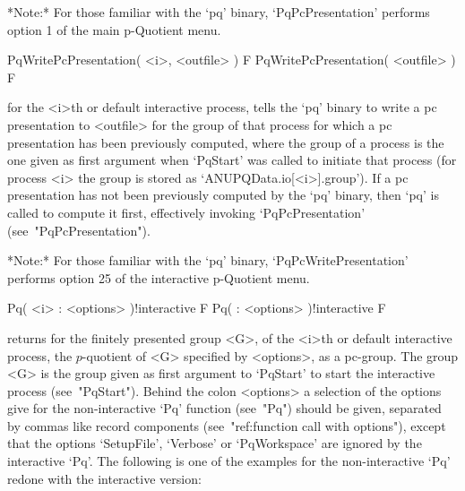 *Note:* For those  familiar  with  the  `pq'  binary,  `PqPcPresentation'
performs option 1 of the main p-Quotient menu.

\>PqWritePcPresentation( <i>, <outfile> ) F
\>PqWritePcPresentation( <outfile> ) F

for the <i>th or default interactive {\ANUPQ}  process,  tells  the  `pq'
binary to write a pc presentation to <outfile>  for  the  group  of  that
process for which a pc presentation has been previously  computed,  where
the group of a process is the one given as first argument when  `PqStart'
was called to initiate that process (for process <i> the group is  stored
as  `ANUPQData.io[<i>].group').  If  a  pc  presentation  has  not   been
previously computed by the `pq' binary, then `pq' is called to compute it
first, effectively invoking `PqPcPresentation' (see~"PqPcPresentation").

*Note:* For those familiar with the `pq' binary,  `PqPcWritePresentation'
performs option 25 of the interactive p-Quotient menu.



\>Pq( <i> : <options> )!{interactive} F
\>Pq( : <options> )!{interactive} F

returns for the finitely presented group <G>, of  the  <i>th  or  default
interactive {\ANUPQ}  process,  the  $p$-quotient  of  <G>  specified  by
<options>, as a pc-group. The group <G>  is  the  group  given  as  first
argument  to  `PqStart'  to  start  the  interactive   {\ANUPQ}   process
(see~"PqStart"). Behind the colon <options> a selection  of  the  options
give for the non-interactive `Pq' function (see~"Pq")  should  be  given,
separated by commas like record components (see~"ref:function  call  with
options"),  except   that   the   options   `SetupFile',   `Verbose'   or
`PqWorkspace' are ignored by the interactive `Pq'. The following  is  one
of the examples for the non-interactive `Pq' redone with the  interactive
version:

